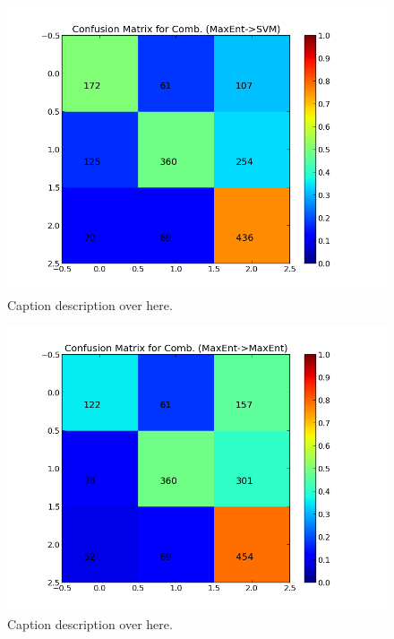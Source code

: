 \begin{minipage}[s]{\linewidth}
     \begin{minipage}{0.45\linewidth}
          \begin{figure}[H]
               \includegraphics[width=\linewidth]{../img/plots/grid/confusion_matrix_Comb-MaxEnt-SVM.png}
           \caption[Results overview across models]{Caption description over here.}
           \label{fig:confmat_maxent_svm}
          \end{figure}
     \end{minipage}
     \hspace{0.05\linewidth}
     \begin{minipage}{0.45\linewidth}
          \begin{figure}[H]
               \includegraphics[width=\linewidth]{../img/plots/grid/confusion_matrix_Comb-MaxEnt-MaxEnt.png}
           \caption[Results overview across models]{Caption description over here.}
           \label{fig:confmat_maxent_maxent}
          \end{figure}
     \end{minipage}
\end{minipage}

